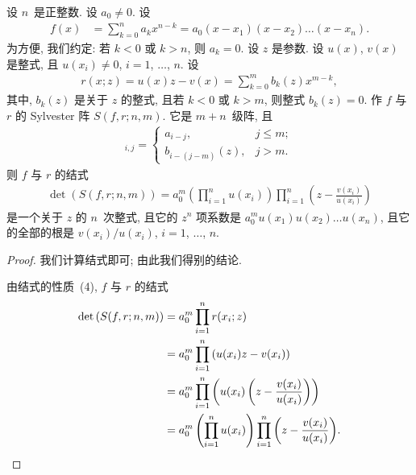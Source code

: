 \documentclass[../libro.tex]{subfiles}
\begin{document}
\begin{theorem}
    设 \(n\)~是正整数.
    设 \(a_0 \neq 0\).
    设
    \begin{align*}
        f(x) &
        = \sum_{k = 0}^{n} {a_k x^{n-k}}
        = a_0 (x - x_1) (x - x_2) \dots (x - x_n).
    \end{align*}
    为方便, 我们约定:
    若 \(k < 0\) 或 \(k > n\), 则 \(a_k = 0\).
    设 \(z\) 是参数.
    设 \(u(x)\), \(v(x)\) 是整式,
    且 \(u(x_i) \neq 0\), \(i = 1\), \(\dots\), \(n\).
    设
    \begin{align*}
        r(x; z) = u(x) z - v(x)
        = \sum_{k = 0}^{m} {b_k (z) x^{m-k}},
    \end{align*}
    其中, \(b_k (z)\) 是关于 \(z\) 的整式,
    且若 \(k < 0\) 或 \(k > m\),
    则整式 \(b_k (z) = 0\).
    作 \(f\) 与 \(r\) 的 Sylvester 阵 \(S(f, r; n, m)\).
    它是 \(m + n\)~级阵, 且
    \begin{align*}
        [S(f, r; n, m)]_{i,j} =
        \begin{cases}
            a_{i-j},         & j \leq m; \\
            b_{i-(j-m)} (z), & j > m.
        \end{cases}
    \end{align*}
    则 \(f\) 与 \(r\) 的结式
    \begin{align*}
        \det {(S(f, r; n, m))}
        = a_0^m \left(\prod_{i = 1}^{n} {u(x_i)} \right)
        \prod_{i = 1}^{n} {\left(z - \frac{v(x_i)}{u(x_i)}\right)}
    \end{align*}
    是一个关于 \(z\) 的 \(n\)~次整式,
    且它的 \(z^{n}\) 项系数是 \(a_0^m u(x_1) u(x_2) \dots u(x_n)\),
    且它的全部的根是 \(v(x_i) / u(x_i)\),
    \(i = 1\), \(\dots\), \(n\).
\end{theorem}

\begin{proof}
    我们计算结式即可;
    由此我们得别的结论.

    由结式的性质~(4), \(f\) 与 \(r\) 的结式
    \begin{align*}
        \det {(S(f, r; n, m))}
        = {} &
        a_0^m \prod_{i = 1}^{n} {r(x_i; z)}
        \\
        = {} &
        a_0^m \prod_{i = 1}^{n} {(u(x_i) z - v(x_i))}
        \\
        = {} &
        a_0^m \prod_{i = 1}^{n}
        {\left(u(x_i) \left(z - \frac{v(x_i)}{u(x_i)}\right) \right)}
        \\
        = {} &
        a_0^m \left(\prod_{i = 1}^{n} {u(x_i)} \right)
        \prod_{i = 1}^{n} {\left(z - \frac{v(x_i)}{u(x_i)}\right)}.
        \qedhere
    \end{align*}
\end{proof}
\end{document}
